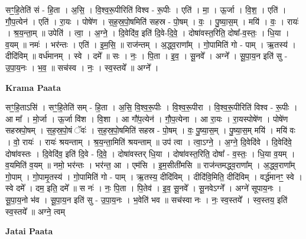\documentclass[17pt]{extarticle}
\begin{document}
सꣳ॒॒हि॒तेति॑ सं - हि॒ता । अ॒सि॒ । वि॒श्व॒रू॒पीरिति॑ विश्व - रू॒पीः । एति॑ । मा॒ । ऊ॒र्जा । वि॒श॒ । एति॑ । गौ॒प॒त्येन॑ । एति॑ । रा॒यः । पोषे॑ण । स॒ह॒स्र॒पो॒षमिति॑ सहस्र - पो॒षम् । वः॒ । पु॒ष्या॒स॒म् । मयि॑ । वः॒ । रायः॑ । श्र॒य॒न्ता॒म् ॥ उपेति॑ । त्वा॒ । अ॒ग्ने॒ । दि॒वेदि॑व॒ इति॑ दि॒वे-दि॒वे॒ । दोषा॑वस्त॒रिति॒ दोषा᳚-व॒स्तः॒ । धि॒या । व॒यम् ॥ नमः॑ । भर॑न्तः । एति॑ । इ॒म॒सि॒ ॥ राज॑न्तम् । अ॒द्ध्व॒राणा᳚म् । गो॒पामिति॑ गो - पाम् । ऋ॒तस्य॑ । दीदि॑विम् ॥ वर्ध॑मानम् । स्वे । दमे᳚ ॥ सः । नः॒ । पि॒ता । इ॒व॒ । सू॒नवे᳚ । अग्ने᳚ । सू॒पा॒य॒न इति॑ सु - उ॒पा॒य॒नः । भ॒व॒ ॥ सच॑स्व ।  नः॒ । स्व॒स्तये᳚ ॥ अग्ने᳚ ।  \newline


\textbf{Krama Paata} \newline

सꣳ॒॒हि॒ताऽसि॑ । सꣳ॒॒हि॒तेति॑ सम् - हि॒ता । अ॒सि॒ वि॒श्व॒रू॒पीः । वि॒श्व॒रू॒पीरा । वि॒श्व॒रू॒पीरिति॑ विश्व - रू॒पीः । आ मा᳚ । मो॒र्जा । ऊ॒र्जा वि॑श । वि॒शा । आ गौ॑प॒त्येन॑ । गौ॒प॒त्येना । आ रा॒यः । रा॒यस्पोषे॑ण । पोषे॑ण सहस्रपो॒षम् । स॒ह॒स्र॒पो॒षं ॅवः॑ । स॒ह॒स्र॒पो॒षमिति॑ सहस्र - पो॒षम् । वः॒ पु॒ष्या॒स॒म् । पु॒ष्या॒स॒म् मयि॑ । मयि॑ वः । वो॒ रायः॑ । रायः॑ श्रयन्ताम् । श्र॒य॒न्ता॒मिति॑ श्रयन्ताम् ॥ उप॑ त्वा । त्वा॒ऽग्ने॒ । अ॒ग्ने॒ दि॒वेदि॑वे । दि॒वेदि॑वे॒ दोषा॑वस्तः । दि॒वेदि॑व॒ इति॑ दि॒वे - दि॒वे॒ । दोषा॑वस्तर् धि॒या । दोषा॑वस्त॒रिति॒ दोषा᳚ - व॒स्तः॒ । धि॒या व॒यम् । व॒यमिति॑ व॒यम् ॥ नमो॒ भर॑न्तः । भर॑न्त॒ आ । एम॑सि । इ॒म॒सीती॑मसि ॥ राज॑न्तमद्ध्व॒राणा᳚म् । अ॒द्ध्व॒राणा᳚म् गो॒पाम् । गो॒पामृ॒तस्य॑ । गो॒पामिति॑ गो - पाम् । ऋ॒तस्य॒ दीदि॑विम् । दीदि॑वि॒मिति॒ दीदि॑विम् । वर्द्ध॑मानꣳ॒॒ स्वे । स्वे दमे᳚ । दम॒ इति॒ दमे᳚ ॥ स नः॑ । नः॒ पि॒ता । पि॒तेव॑ । इ॒व॒ सू॒नवे᳚ । सू॒नवेऽग्ने᳚ । अग्ने॑ सूपाय॒नः । सू॒पा॒य॒नो भ॑व । सू॒पा॒य॒न इति॑ सु - उ॒पा॒य॒नः । भ॒वेति॑ भव ॥ सच॑स्वा नः । नः॒ स्व॒स्तये᳚ । स्व॒स्तय॒ इति॑ स्व॒स्तये᳚ ॥ अग्ने॒ त्वम् \newline

\textbf{Jatai Paata} \newline
\end{document}
